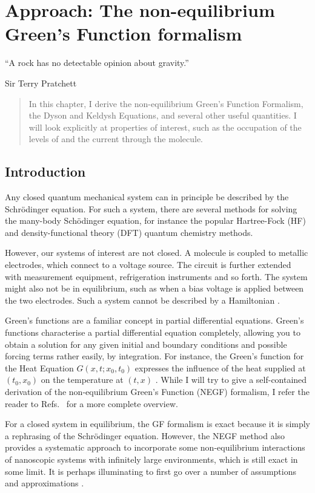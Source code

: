 \chapter{Approach: The non-equilibrium Green's Function formalism}
\label{ch:chapter_2}

\epigraph{
    “A rock has no detectable opinion about gravity.”
}{Sir Terry Pratchett}

\begin{abstract}
In this chapter, I derive the non-equilibrium Green's Function Formalism, the Dyson and Keldysh Equations, and several other useful quantities. I will look explicitly at properties of interest, such as the occupation of the levels of and the current through the molecule.
\end{abstract}

\newpage
\section{Introduction}
Any closed quantum mechanical system can in principle be described by the Schr\"odinger equation. For such a system, there are several methods for solving the many-body Sch\"odinger equation, for instance the popular Hartree-Fock (HF) and density-functional theory (DFT) quantum chemistry methods.

However, our systems of interest are not closed. A molecule is coupled to metallic electrodes, which connect to a voltage source. The circuit is further extended with measurement equipment, refrigeration instruments and so forth. The system might also not be in equilibrium, such as when a bias voltage is applied between the two electrodes. Such a system cannot be described by a Hamiltonian \cite{seldenthuis}.

Green's functions are a familiar concept in partial differential equations. Green's functions characterise a partial differential equation completely, allowing you to obtain a solution for any given initial and boundary conditions and possible forcing terms rather easily, by integration. For instance, the Green's function for the Heat Equation $G(x,t; x_0, t_0)$ expresses the influence of the heat supplied at $(t_0, x_0)$ on the temperature at $(t,x)$ \cite{haberman}. 
While I will try to give a self-contained derivation of the non-equilibrium Green's Function (NEGF) formalism, I refer the reader to Refs.~\cite{mattuck,diventra,haugjauho, leeuwen} for a more complete overview.

For a closed system in equilibrium, the GF formalism is exact because it is simply a rephrasing of the Schr\"odinger equation. However, the NEGF method also provides a systematic approach to incorporate some non-equilibrium interactions of nanoscopic systems with infinitely large environments, which is still exact in some limit. It is perhaps illuminating to first go over a number of assumptions and approximations \cite{seldenthuis}. 

